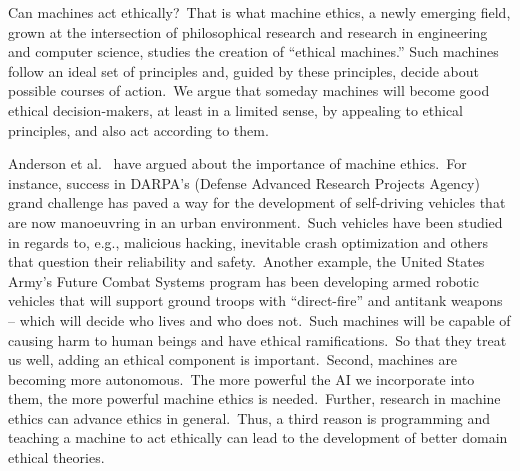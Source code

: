 Can machines act ethically?\ That is what machine ethics, a newly emerging field, grown at the intersection of philosophical research and research in engineering and computer science, studies the creation of “ethical machines.” Such machines follow an ideal set of principles and, guided by these principles, decide about possible courses of action.\ We argue that someday machines will become good ethical decision-makers, at least in a limited sense, by appealing to ethical principles, and also act according to them.

\indent Anderson et al.\ \cite{Anderson_Anderson_2007} have argued about the importance of machine ethics.\ For instance, success in DARPA’s (Defense Advanced Research Projects Agency) grand challenge has paved a way for the development of self-driving vehicles that are now manoeuvring in an urban environment.\ Such vehicles have been studied in regards to, e.g., malicious hacking, inevitable crash optimization and others that question their reliability and safety.\ Another example, the United States Army’s Future Combat Systems program has been developing armed robotic vehicles that will support ground troops with “direct-fire” and antitank weapons -- which will decide who lives and who does not.\ Such machines will be capable of causing harm to human beings and have ethical ramifications.\ So that they treat us well, adding an ethical component is important.\ Second, machines are becoming more autonomous.\ The more powerful the AI we incorporate into them, the more powerful machine ethics is needed.\ Further, research in machine ethics can advance ethics in general.\ Thus, a third reason is programming and teaching a machine to act ethically can lead to the development of better domain ethical theories.

